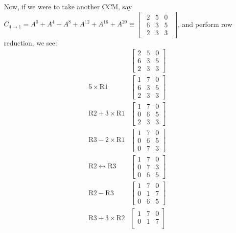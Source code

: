 \documentclass[a4paper, reqno, 12pt]{amsart}
\begin{document}
	Now, if we were to take another CCM, say $C_{4 \rightarrow 1} = A^0 + A^4 + A^8 + A^{12} + A^{16} + A^{20} \equiv
	\begin{bmatrix}
		\begin{smallmatrix}
			2 & 5 & 0 \\
			6 & 3 & 5 \\
			2 & 3 & 3
		\end{smallmatrix}
	\end{bmatrix}$, and perform row reduction, we see:
	\begin{align*}
		& 
		\begin{bmatrix}
			2 & 5 & 0 \\
			6 & 3 & 5 \\
			2 & 3 & 3
		\end{bmatrix} \\
		5 \times \text{R}1 &
		\begin{bmatrix}
			1 & 7 & 0 \\
			6 & 3 & 5 \\
			2 & 3 & 3
		\end{bmatrix} \\
		\text{R}2 + 3 \times \text{R}1 & 
		\begin{bmatrix}
			1 & 7 & 0 \\
			0 & 6 & 5 \\
			2 & 3 & 3
		\end{bmatrix} \\
		\text{R}3 - 2 \times \text{R}1 &
		\begin{bmatrix}
			1 & 7 & 0 \\
			0 & 6 & 5 \\
			0 & 7 & 3 
		\end{bmatrix} \\
		\text{R}2 \leftrightarrow \text{R}3 &
		\begin{bmatrix}
			1 & 7 & 0 \\
			0 & 7 & 3 \\
			0 & 6 & 5
		\end{bmatrix} \\
		\text{R}2 - \text{R}3 &
		\begin{bmatrix}
			1 & 7 & 0 \\
			0 & 1 & 7 \\
			0 & 6 & 5
		\end{bmatrix} \\
		\text{R}3 + 3 \times \text{R}2 &
		\begin{bmatrix}
			1 & 7 & 0 \\
			0 & 1 & 7 \\

\end{bmatrix}
\end{align*}
\end{document}
